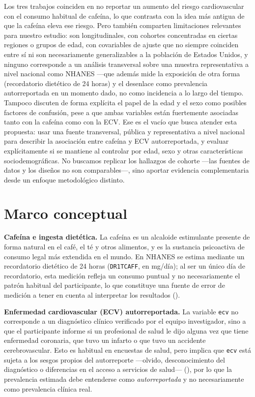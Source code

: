 \documentclass[
  spanish,
  12pt,
]{article}
\begin{document}
Los tres trabajos coinciden en no reportar un aumento del riesgo
cardiovascular con el consumo habitual de cafeína, lo que contrasta con
la idea más antigua de que la cafeína eleva ese riesgo. Pero también
comparten limitaciones relevantes para nuestro estudio: son
longitudinales, con cohortes concentradas en ciertas regiones o grupos
de edad, con covariables de ajuste que no siempre coinciden entre sí ni
son necesariamente generalizables a la población de Estados Unidos, y
ninguno corresponde a un análisis transversal sobre una muestra
representativa a nivel nacional como NHANES ---que además mide la
exposición de otra forma (recordatorio dietético de 24 horas) y el
desenlace como prevalencia autorreportada en un momento dado, no como
incidencia a lo largo del tiempo. Tampoco discuten de forma explícita
el papel de la edad y el sexo como posibles factores de confusión,
pese a que ambas variables están fuertemente asociadas tanto con la
cafeína como con la ECV. Ese es el vacío que busca atender esta
propuesta: usar una fuente transversal, pública y representativa a
nivel nacional para describir la asociación entre cafeína y ECV
autorreportada, y evaluar explícitamente si se mantiene al controlar
por edad, sexo y otras características sociodemográficas. No buscamos
replicar los hallazgos de cohorte ---las fuentes de datos y los diseños
no son comparables---, sino aportar evidencia complementaria desde un
enfoque metodológico distinto.

\section{Marco conceptual}\label{marco-conceptual}

\textbf{Cafeína e ingesta dietética.} La cafeína es un alcaloide estimulante
presente de forma natural en el café, el té y otros alimentos, y es la
sustancia psicoactiva de consumo legal más extendida en el mundo. En
NHANES se estima mediante un recordatorio dietético de 24 horas
(\texttt{DR1TCAFF}, en mg/día); al ser un único día de recordatorio, esta
medición refleja un consumo puntual y no necesariamente el patrón
habitual del participante, lo que constituye una fuente de error de
medición a tener en cuenta al interpretar los resultados
().

\textbf{Enfermedad cardiovascular (ECV) autorreportada.} La variable \texttt{ecv}
no corresponde a un diagnóstico clínico verificado por el equipo
investigador, sino a que el participante informe si un profesional de
salud le dijo alguna vez que tiene enfermedad coronaria, que tuvo un
infarto o que tuvo un accidente cerebrovascular. Esto es habitual en
encuestas de salud, pero implica que \texttt{ecv} está sujeta a los sesgos
propios del autorreporte ---olvido, desconocimiento del diagnóstico o
diferencias en el acceso a servicios de salud--- (),
por lo que la prevalencia estimada debe entenderse como
\emph{autorreportada} y no necesariamente como prevalencia clínica real.
\end{document}
